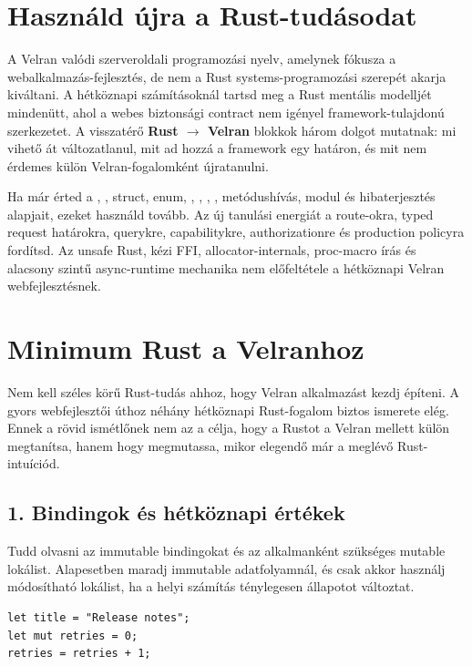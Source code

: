 \section*{Használd újra a Rust-tudásodat}

A Velran valódi szerveroldali programozási nyelv, amelynek fókusza a webalkalmazás-fejlesztés, de nem a Rust systems-programozási szerepét akarja kiváltani. A hétköznapi számításoknál tartsd meg a Rust mentális modelljét mindenütt, ahol a webes biztonsági contract nem igényel framework-tulajdonú szerkezetet. A visszatérő \textbf{Rust $\rightarrow$ Velran} blokkok három dolgot mutatnak: mi vihető át változatlanul, mit ad hozzá a framework egy határon, és mit nem érdemes külön Velran-fogalomként újratanulni.

Ha már érted a , , struct, enum, , , , , metódushívás, modul és  hibaterjesztés alapjait, ezeket használd tovább. Az új tanulási energiát a route-okra, typed request határokra, querykre, capabilitykre, authorizationre és production policyra fordítsd. Az unsafe Rust, kézi FFI, allocator-internals, proc-macro írás és alacsony szintű async-runtime mechanika nem előfeltétele a hétköznapi Velran webfejlesztésnek.


\section*{Minimum Rust a Velranhoz}

Nem kell széles körű Rust-tudás ahhoz, hogy Velran alkalmazást kezdj építeni. A gyors webfejlesztői úthoz néhány hétköznapi Rust-fogalom biztos ismerete elég. Ennek a rövid ismétlőnek nem az a célja, hogy a Rustot a Velran mellett külön megtanítsa, hanem hogy megmutassa, mikor elegendő már a meglévő Rust-intuíciód.

\subsection*{1. Bindingok és hétköznapi értékek}

Tudd olvasni az immutable bindingokat és az alkalmanként szükséges mutable lokálist. Alapesetben maradj immutable adatfolyamnál, és csak akkor használj módosítható lokálist, ha a helyi számítás ténylegesen állapotot változtat.

\begin{lstlisting}[language=Velran]
let title = "Release notes";
let mut retries = 0;
retries = retries + 1;
\end{lstlisting}

